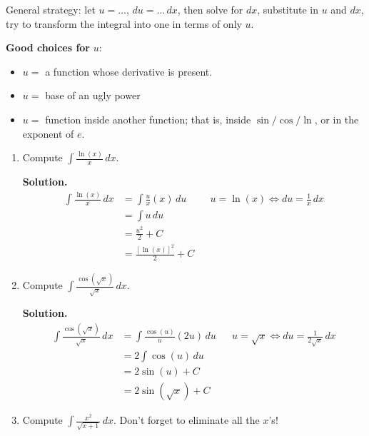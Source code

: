 General strategy: let $ u=\ldots $, $ du=\ldots\,dx $, then solve for
$ dx $, substitute in $ u $ and $ dx $, try to transform the integral into one
in terms of only $ u $.

\textbf{Good choices for} $ u $:
\begin{itemize}
    \item $ u= $ a function whose derivative is present.
    \item $ u= $ base of an ugly power
    \item $ u= $ function inside another function; that is, inside $ \sin/\cos/\ln $,
          or in the exponent of $ e $.
\end{itemize}

\begin{Example}{}{}
    \begin{enumerate}[label=(\roman*)]
        \item Compute $ \displaystyle  \int \frac{\ln(x)}{x} \, d{x} $.

              \textbf{Solution.}
              \begin{align*}
                  \int \frac{\ln(x)}{x} \, d{x}
                   & =\int \frac{u}{x} (x)\, d{u} &  & u=\ln(x)\iff du=\frac{1}{x}\, dx \\
                   & =\int u\, d{u}                                                     \\
                   & =\frac{u^2}{2} +C                                                  \\
                   & =\frac{[\ln(x)]^2}{2} +C
              \end{align*}
        \item Compute $ \displaystyle \int \frac{\cos(\sqrt{x})}{\sqrt{x}} \, d{x} $.

              \textbf{Solution.}
              \begin{align*}
                  \int \frac{\cos(\sqrt{x})}{\sqrt{x}} \, d{x}
                   & = \int \frac{\cos(u)}{u}(2u) \, d{u} &  & u=\sqrt{x}\iff du=\frac{1}{2\sqrt{x}}\, dx \\
                   & =2 \int \cos(u)\, d{u}                                                               \\
                   & =2\sin(u)+C                                                                          \\
                   & =2\sin(\sqrt{x})+C
              \end{align*}
        \item Compute
              $ \displaystyle \int \frac{x^2}{\sqrt{x+1}} \, d{x} $.
              Don't forget to eliminate all the $ x $'s!


\end{enumerate}
\end{Example}
